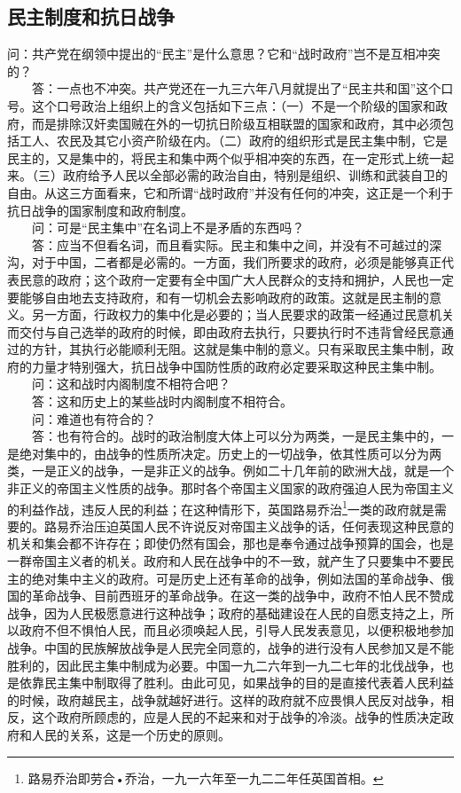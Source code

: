 \documentclass[cn,11pt,chinese]{elegantbook}
\def\myformat#1{\hfil\hfil #1}
\begin{document}
\subsection*{\myformat{民主制度和抗日战争}}
问：共产党在纲领中提出的“民主”是什么意思？它和“战时政府”岂不是互相冲突的？\\
　　答：一点也不冲突。共产党还在一九三六年八月就提出了“民主共和国”这个口号。这个口号政治上组织上的含义包括如下三点：（一）不是一个阶级的国家和政府，而是排除汉奸卖国贼在外的一切抗日阶级互相联盟的国家和政府，其中必须包括工人、农民及其它小资产阶级在内。（二）政府的组织形式是民主集中制，它是民主的，又是集中的，将民主和集中两个似乎相冲突的东西，在一定形式上统一起来。（三）政府给予人民以全部必需的政治自由，特别是组织、训练和武装自卫的自由。从这三方面看来，它和所谓“战时政府”并没有任何的冲突，这正是一个利于抗日战争的国家制度和政府制度。\\
　　问：可是“民主集中”在名词上不是矛盾的东西吗？\\
　　答：应当不但看名词，而且看实际。民主和集中之间，并没有不可越过的深沟，对于中国，二者都是必需的。一方面，我们所要求的政府，必须是能够真正代表民意的政府；这个政府一定要有全中国广大人民群众的支持和拥护，人民也一定要能够自由地去支持政府，和有一切机会去影响政府的政策。这就是民主制的意义。另一方面，行政权力的集中化是必要的；当人民要求的政策一经通过民意机关而交付与自己选举的政府的时候，即由政府去执行，只要执行时不违背曾经民意通过的方针，其执行必能顺利无阻。这就是集中制的意义。只有采取民主集中制，政府的力量才特别强大，抗日战争中国防性质的政府必定要采取这种民主集中制。\\
　　问：这和战时内阁制度不相符合吧？\\
　　答：这和历史上的某些战时内阁制度不相符合。\\
　　问：难道也有符合的？\\
　　答：也有符合的。战时的政治制度大体上可以分为两类，一是民主集中的，一是绝对集中的，由战争的性质所决定。历史上的一切战争，依其性质可以分为两类，一是正义的战争，一是非正义的战争。例如二十几年前的欧洲大战，就是一个非正义的帝国主义性质的战争。那时各个帝国主义国家的政府强迫人民为帝国主义的利益作战，违反人民的利益；在这种情形下，英国路易乔治\footnote[4]{ 路易乔治即劳合•乔治，一九一六年至一九二二年任英国首相。}一类的政府就是需要的。路易乔治压迫英国人民不许说反对帝国主义战争的话，任何表现这种民意的机关和集会都不许存在；即使仍然有国会，那也是奉令通过战争预算的国会，也是一群帝国主义者的机关。政府和人民在战争中的不一致，就产生了只要集中不要民主的绝对集中主义的政府。可是历史上还有革命的战争，例如法国的革命战争、俄国的革命战争、目前西班牙的革命战争。在这一类的战争中，政府不怕人民不赞成战争，因为人民极愿意进行这种战争；政府的基础建设在人民的自愿支持之上，所以政府不但不惧怕人民，而且必须唤起人民，引导人民发表意见，以便积极地参加战争。中国的民族解放战争是人民完全同意的，战争的进行没有人民参加又是不能胜利的，因此民主集中制成为必要。中国一九二六年到一九二七年的北伐战争，也是依靠民主集中制取得了胜利。由此可见，如果战争的目的是直接代表着人民利益的时候，政府越民主，战争就越好进行。这样的政府就不应畏惧人民反对战争，相反，这个政府所顾虑的，应是人民的不起来和对于战争的冷淡。战争的性质决定政府和人民的关系，这是一个历史的原则。\\
\end{document}
